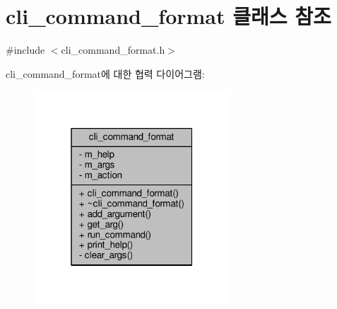 \hypertarget{classcli__command__format}{}\section{cli\+\_\+command\+\_\+format 클래스 참조}
\label{classcli__command__format}


{\ttfamily \#include $<$cli\+\_\+command\+\_\+format.\+h$>$}



cli\+\_\+command\+\_\+format에 대한 협력 다이어그램\+:
\nopagebreak
\begin{figure}[H]
\begin{center}
\leavevmode
\includegraphics[width=208pt]{classcli__command__format__coll__graph}
\end{center}
\end{figure}
